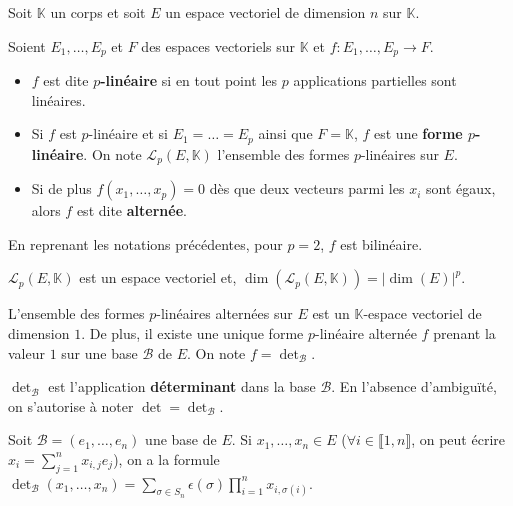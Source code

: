   Soit $\mathbb{K}$ un corps et soit $E$ un espace vectoriel de dimension $n$ sur $\mathbb{K}$.

  \begin{definition}
    Soient $E_1, \dots, E_p$ et $F$ des espaces vectoriels sur $\mathbb{K}$ et $f : E_1, \dots, E_p \rightarrow F$.
    \begin{itemize}
      \item $f$ est dite \textbf{$p$-linéaire} si en tout point les $p$ applications partielles sont linéaires.
      \item Si $f$ est $p$-linéaire et si $E_1 = \dots = E_p$ ainsi que $F = \mathbb{K}$, $f$ est une \textbf{forme $p$-linéaire}. On note $\mathcal{L}_p(E, \mathbb{K})$ l'ensemble des formes $p$-linéaires sur $E$.
      \item Si de plus $f(x_1, \dots, x_p) = 0$ dès que deux vecteurs parmi les $x_i$ sont égaux, alors $f$ est dite \textbf{alternée}.
    \end{itemize}
  \end{definition}

  \begin{example}
    En reprenant les notations précédentes, pour $p = 2$, $f$ est bilinéaire.
  \end{example}

  \begin{proposition}
    $\mathcal{L}_p(E, \mathbb{K})$ est un espace vectoriel et, $\operatorname{dim}(\mathcal{L}_p(E, \mathbb{K})) = |\operatorname{dim}(E)|^p$.
  \end{proposition}

  \begin{theorem}
    L'ensemble des formes $p$-linéaires alternées sur $E$ est un $\mathbb{K}$-espace vectoriel de dimension $1$. De plus, il existe une unique forme $p$-linéaire alternée $f$ prenant la valeur $1$ sur une base $\mathcal{B}$ de $E$. On note $f = \det_{\mathcal{B}}$.
  \end{theorem}

  \begin{definition}
    $\det_{\mathcal{B}}$ est l'application \textbf{déterminant} dans la base $\mathcal{B}$. En l'absence d'ambiguïté, on s'autorise à noter $\det = \det_{\mathcal{B}}$.
  \end{definition}

  \begin{proposition}
    Soit $\mathcal{B} = (e_1, \dots, e_n)$ une base de $E$. Si $x_1, \dots, x_n \in E$ ($\forall i \in \llbracket 1, n \rrbracket$, on peut écrire $x_i = \sum_{j=1}^n x_{i,j} e_j$), on a la formule $\det_{\mathcal{B}}(x_1, \dots, x_n) = \sum_{\sigma \in S_n} \epsilon(\sigma) \prod_{i=1}^n x_{i,\sigma(i)}$.
  \end{proposition}

